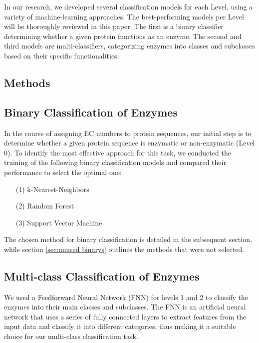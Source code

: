 \documentclass{bioinfo}
\begin{document}
In our research, we developed several classification models for each Level, using a variety of machine-learning approaches.
The best-performing models per Level will be thoroughly reviewed in this paper.
The first is a binary classifier determining whether a given protein functions as an enzyme. 
The second and third models are multi-classifiers, categorizing enzymes into classes and subclasses 
based on their specific functionalities. 

\clearpage
\begin{methods}
\section{Methods}

\subsection{Binary Classification of Enzymes}
In the course of assigning EC numbers to protein sequences,
our initial step is to determine whether a given protein sequence is enzymatic or non-enzymatic (Level 0).
To identify the most effective approach for this task,
we conducted the training of the following binary classification models and compared their performance to select the optimal one:
\begin{enumerate}
	\item[(1)] k-Nearest-Neighbors
	\item[(2)] Random Forest 
	\item[(3)] Support Vector Machine
\end{enumerate}
The chosen method for binary classification is detailed in the subsequent section, while section \ref{sec:unused binarys} outlines the methods that were not selected.

\subsection{Multi-class Classification of Enzymes}
We used a Feedforward Neural Network (FNN) for levels 1 and 2 to classify the enzymes into their main classes and subclasses.
The FNN is an artificial neural network that uses a series of fully connected layers to extract features from the input data and classify it into different categories,
thus making it a suitable choice for our multi-class classification task. 


\end{methods}
\end{document}
